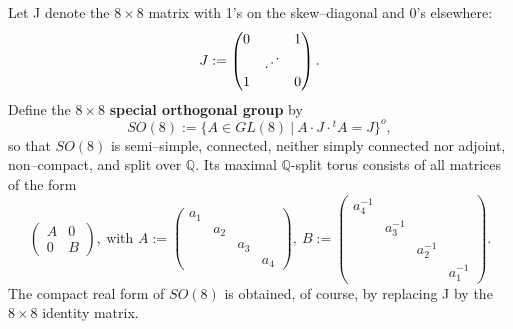 \documentclass[12pt,letterpaper]{amsart}
\newcommand{\qqq}{\mathbb{Q}}
\newcommand{\iddots}{\mathinner{\mkern1mu\raise1pt\hbox{.}\mkern2mu%
  \raise4pt\hbox{.}\mkern2mu\raise7pt\vbox{\kern7pt\hbox{.}}\mkern1mu}}
\begin{document}
Let J denote the $8\times 8$ matrix with 1's on the skew--diagonal and
0's elsewhere:
\[
J := \begin{pmatrix} 0 & & 1 \\
   & \iddots & \\
   1 & & 0
   \end{pmatrix}.
\]
Define the $8\times 8$ \textbf{special orthogonal group}
by
\[
SO(8) := \{A \in GL(8) \ |\ A\cdot J\cdot {}^{t}A = J\}^o,
\]
so that $SO(8)$ is semi--simple, connected, neither simply connected
nor adjoint, non--compact, and split over $\qqq$. Its maximal $\qqq$-split
torus consists of all matrices of the form
\[
\begin{pmatrix} A&0\\0&B \end{pmatrix},\ \text{with }
A:=\begin{pmatrix} a_1&&&\\
&a_2&&\\
&&a_3&\\
&&&a_4 \end{pmatrix},\
B:= \begin{pmatrix} a_4^{-1}&&&\\
&a_3^{-1}&&\\
&&a_2^{-1}&\\
&&&a_1^{-1} \end{pmatrix}.\tag{A.1}
\]
The compact real form of $SO(8)$ is obtained, of course, by replacing
J by the $8\times 8$ identity matrix.
\end{document}
